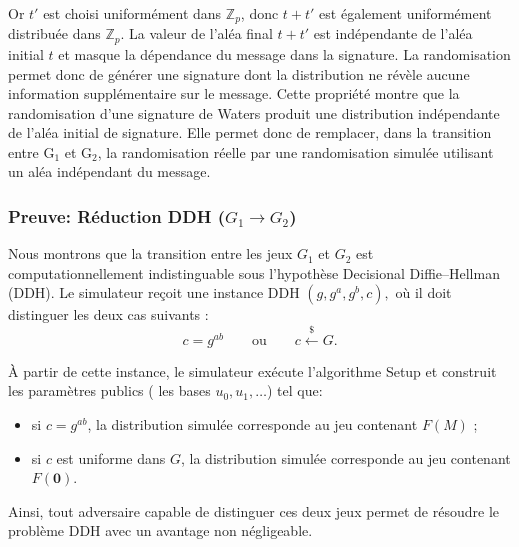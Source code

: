 Or $t'$ est choisi uniformément dans $\mathbb{Z}_p$, donc
$t+t'$ est également uniformément distribuée dans $\mathbb{Z}_p$.
La valeur de l'aléa final $t+t'$ est indépendante de l'aléa
initial $t$ et masque la dépendance du message dans la signature. La
randomisation permet donc de générer une signature dont la distribution ne
révèle aucune information supplémentaire sur le message.
Cette propriété montre que la randomisation d'une signature de Waters
produit une distribution indépendante de l'aléa initial de signature.
Elle permet donc de remplacer, dans la transition entre G$_1$ et G$_2$,
la randomisation réelle par une randomisation simulée utilisant un aléa
indépendant du message.

\subsubsection{Preuve: Réduction DDH ($G_1 \rightarrow G_2$)}
\label{sec:DDH-waters}

Nous montrons que la transition entre les jeux $G_1$ et $G_2$ est
computationnellement indistinguable sous l'hypothèse Decisional
Diffie--Hellman (DDH).
Le simulateur reçoit une instance DDH
$
(g, g^a, g^b, c),
$
où il doit distinguer les deux cas suivants :
\[
c = g^{ab}
\qquad \text{ou} \qquad
c \xleftarrow{\$} G.
\]

À partir de cette instance, le simulateur exécute l'algorithme \textsf{Setup} et construit les paramètres publics ( les bases $u_0, u_1, \ldots$) tel que:
\begin{itemize}
    \item si $c = g^{ab}$, la distribution simulée corresponde au jeu contenant $F(M)$ ;
    \item si $c$ est uniforme dans $G$, la distribution simulée corresponde au jeu contenant $F(\mathbf{0})$.
\end{itemize}

Ainsi, tout adversaire capable de distinguer ces deux jeux permet de résoudre le problème DDH avec un avantage non négligeable.
